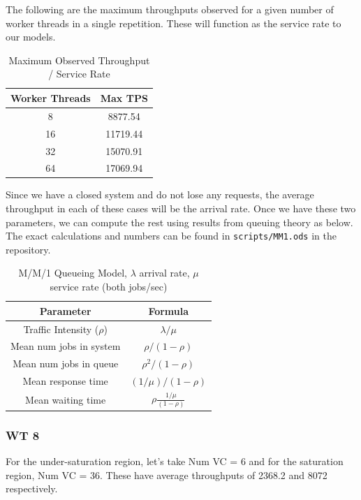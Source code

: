 \documentclass[11pt,a4paper]{article}
\begin{document}
The following are the maximum throughputs observed for a given number of worker threads in a single repetition. These will function as the service rate to our models. 
\begin{table}[H]
	\centering
	\caption{Maximum Observed Throughput / Service Rate}
	\begin{tabular}{|c|c|}
		\hline
		\multicolumn{1}{|c|}{Worker Threads} & \multicolumn{1}{c|}{Max TPS} \\ \hline
		8 & 8877.54   \\ \hline
		16 & 11719.44 \\ \hline
		32 & 15070.91 \\ \hline
		64 & 17069.94 \\ \hline
	\end{tabular}
\end{table}
Since we have a closed system and do not lose any requests, the average throughput in each of these cases will be the arrival rate. Once we have these two parameters, we can compute the rest using results from queuing theory as below. The exact calculations and numbers can be found in \texttt{scripts/MM1.ods} in the repository.

\begin{table}[H]
		\centering
	\caption{M/M/1 Queueing Model, $\lambda$ arrival rate, $\mu$ service rate (both jobs/sec)}
	\begin{tabular}{|c|c|}
		\hline
		\multicolumn{1}{|c|}{Parameter} & \multicolumn{1}{c|}{Formula} \\ \hline
		Traffic Intensity ($\rho$) & $\lambda/\mu$ \\ \hline
		Mean num jobs in system    & $\rho / (1-\rho)$ \\ \hline
		Mean num jobs in queue     & $ \rho^{2}/(1 - \rho)$ \\ \hline
		Mean response time         & $ (1/\mu)/(1 - \rho)$ \\ \hline
		Mean waiting time          & $\rho \frac{1/\mu}{(1 - \rho)}$ \\ \hline
	\end{tabular}
	\label{}
\end{table}
 
\subsubsection{WT 8}
For the under-saturation region, let's take Num VC = 6 and for the saturation region, Num VC = 36. These have average throughputs of 2368.2 and 8072 respectively.
\end{document}
